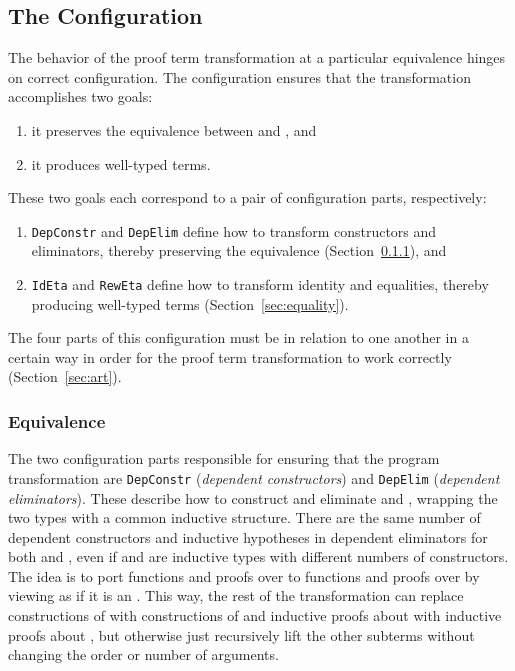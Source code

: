 \subsection{The Configuration}
\label{sec:configurable}

The behavior of the proof term transformation at a particular equivalence hinges on correct configuration.
The configuration ensures that the transformation accomplishes two goals: %

\begin{enumerate}
\item it preserves the equivalence between \A and \B, and
\item it produces well-typed terms.
\end{enumerate}
These two goals each correspond to a pair of configuration parts, respectively:

\begin{enumerate}
\item \lstinline{DepConstr} and \lstinline{DepElim} define how to transform constructors and eliminators, thereby preserving the equivalence (Section~\ref{sec:equivalence}), and 
\item \lstinline{IdEta} and \lstinline{RewEta} define how to transform identity and equalities, thereby producing well-typed terms (Section~\ref{sec:equality}).
\end{enumerate}
The four parts of this configuration must be in relation to one another in a certain way in order for the proof
term transformation to work correctly (Section~\ref{sec:art}).

\subsubsection{Equivalence}
\label{sec:equivalence}

The two configuration parts responsible for ensuring that the program transformation 
are \lstinline{DepConstr} (\textit{dependent constructors}) and \lstinline{DepElim} (\textit{dependent eliminators}).
These describe how to construct and eliminate \A and \B, wrapping the two types with a common inductive structure.
There are the same number of dependent constructors and inductive hypotheses in dependent eliminators for both \A and \B,
even if \A and \B are inductive types with different numbers of constructors.
The idea is to port functions and proofs over \A to functions and proofs over \B by viewing \B as if it is an \A.
This way, the rest of the transformation can replace constructions of \A with constructions of \B and
inductive proofs about \A with inductive proofs about \B, but otherwise just recursively lift
the other subterms without changing the order or number of arguments.

